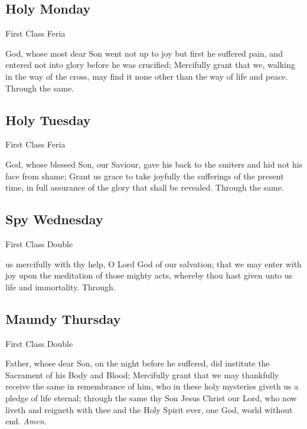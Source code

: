 {}

\subsection{Holy Monday}
\fancyhead[RE,LO]{}
\begin{inhead}
    {First Class Feria}
\end{inhead}

\collect
{} God, whose most dear Son went not up to joy but first he suffered pain, and entered not into glory before he was crucified; Mercifully grant that we, walking in the way of the cross, may find it none other than the way of life and peace. Through the same.

\subsection{Holy Tuesday}
\fancyhead[RE,LO]{}
\begin{inhead}
    {First Class Feria}
\end{inhead}

\collect
{} God, whose blessed Son, our Saviour, gave his back to the smiters and hid not his face from shame; Grant us grace to take joyfully the sufferings of the present time, in full assurance of the glory that shall be revealed. Through the same.


\subsection{Spy Wednesday}
\fancyhead[RE,LO]{}
\begin{inhead}
    {First Class Double}
\end{inhead}

\collect
{} us mercifully with thy help, O Lord God of our salvation; that we may enter with joy upon the meditation of those mighty acts, whereby thou hast given unto us life and immortality. Through.



\subsection{Maundy Thursday}
\fancyhead[RE,LO]{}
\begin{inhead}
    {First Class Double}
\end{inhead}

\collect
{} Father, whose dear Son, on the night before he suffered, did institute the Sacrament of his Body and Blood; Mercifully grant that we may thankfully receive the same in remembrance of him, who in these holy mysteries giveth us a pledge of life eternal; through the same thy Son Jesus Christ our Lord, who now liveth and reigneth with thee and the Holy Spirit ever, one God, world without end. \textit{Amen.}